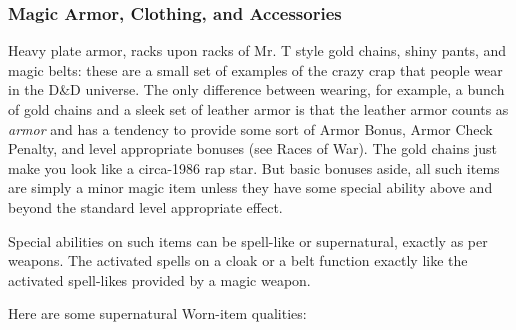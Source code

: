 \subsubsection{Magic Armor, Clothing, and Accessories}
\vspace*{-8pt}

Heavy plate armor, racks upon racks of Mr. T style gold chains, shiny pants, and magic belts: these are a small set of examples of the crazy crap that people wear in the D\&D universe. The only difference between wearing, for example, a bunch of gold chains and a sleek set of leather armor is that the leather armor counts as \textit{armor} and has a tendency to provide some sort of Armor Bonus, Armor Check Penalty, and level appropriate bonuses (see Races of War). The gold chains just make you look like a circa-1986 rap star. But basic bonuses aside, all such items are simply a minor magic item unless they have some special ability above and beyond the standard level appropriate effect.

Special abilities on such items can be spell-like or supernatural, exactly as per weapons. The activated spells on a cloak or a belt function exactly like the activated spell-likes provided by a magic weapon.

Here are some supernatural Worn-item qualities:

